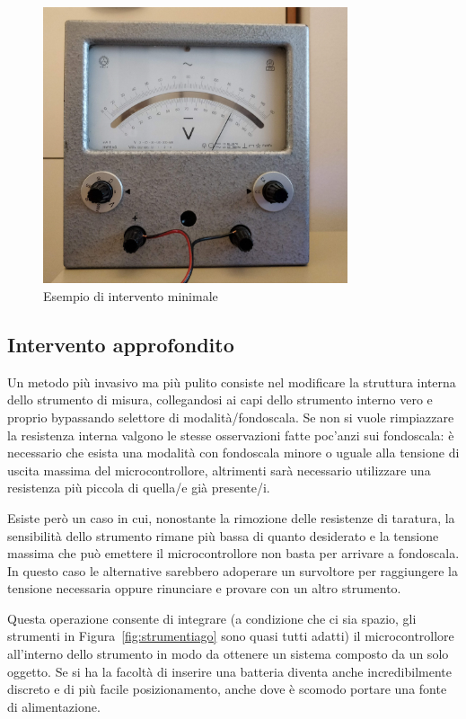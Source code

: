 \documentclass[12pt,a4paper]{report}
\begin{document}
\begin{figure}[h]
  \centering
  \includegraphics[width=0.8\textwidth]{interventominimale}
  \caption{Esempio di intervento minimale}
  \label{fig:interventominimale}
\end{figure}

\subsection{Intervento approfondito}
Un metodo più invasivo ma più pulito consiste nel modificare la struttura interna dello strumento di misura, collegandosi ai capi dello
strumento interno vero e proprio bypassando selettore di modalità/fondoscala.
Se non si vuole rimpiazzare la resistenza interna valgono le stesse osservazioni fatte poc'anzi sui fondoscala: è necessario che
esista una modalità con fondoscala minore o uguale alla tensione di uscita massima del microcontrollore, altrimenti sarà necessario
utilizzare una resistenza più piccola di quella/e già presente/i. 

Esiste però un caso in cui, nonostante la rimozione delle resistenze di taratura, la sensibilità dello strumento rimane più bassa di quanto
desiderato e la tensione massima che può emettere il microcontrollore non basta per arrivare a fondoscala. In questo caso le alternative
sarebbero adoperare un survoltore per raggiungere la tensione necessaria oppure rinunciare e provare con un altro strumento.

Questa operazione consente di integrare (a condizione che ci sia spazio, gli strumenti in Figura~\ref{fig:strumentiago} sono quasi tutti
adatti) il microcontrollore all'interno dello strumento in modo da ottenere un sistema composto da un solo oggetto.
Se si ha la facoltà di inserire una batteria diventa anche incredibilmente discreto e di più facile posizionamento, anche dove è
scomodo portare una fonte di alimentazione.
\end{document}
